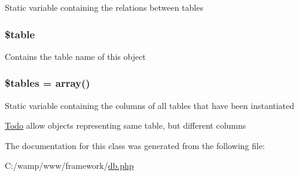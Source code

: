 \label{classtable_a5787b67dccb801e89f4ff779d42edece}
Static variable containing the relations between tables \hypertarget{classtable_ae8876a14058f368335baccf35af4a22b}{
\subsubsection[{\$table}]{\setlength{\rightskip}{0pt plus 5cm}\${\bf table}}}
\label{classtable_ae8876a14058f368335baccf35af4a22b}
Contains the table name of this object \hypertarget{classtable_a3d332a3c374a53802495dcb045f6133f}{
\subsubsection[{\$tables}]{\setlength{\rightskip}{0pt plus 5cm}\$tables = array()}}
\label{classtable_a3d332a3c374a53802495dcb045f6133f}
Static variable containing the columns of all tables that have been instantiated \begin{Desc}
\item[\hyperlink{todo__todo000005}{Todo}]allow objects representing same table, but different columns \end{Desc}


The documentation for this class was generated from the following file:\begin{DoxyCompactItemize}
\item 
C:/wamp/www/framework/\hyperlink{db_8php}{db.php}\end{DoxyCompactItemize}

